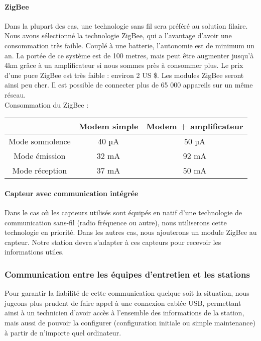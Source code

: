 \paragraph{ZigBee}

Dans la plupart des cas, une technologie sans fil sera préféré au solution filaire. Nous avons sélectionné la technologie ZigBee, qui a l'avantage d'avoir une consommation très faible. Couplé à une batterie, l'autonomie est de minimum un an. 
La portée de ce système est de 100 metres, mais peut être augmenter jusqu'à 4km grâce à un amplificateur si nous sommes près à consommer plus. Le prix d'une puce ZigBee est très faible : environ 2 US \$. Les modules ZigBee seront ainsi peu cher.
Il est possible de connecter plus de 65 000 appareils sur un même réseau.\\

Consommation du ZigBee :

\begin{center}
\begin{tabular}{|c|c|c|}
\hline  & Modem simple & Modem + amplificateur \\ 
\hline Mode somnolence & 40 µA & 50 µA \\ 
\hline Mode émission & 32 mA  & 92 mA \\ 
\hline Mode réception & 37 mA  & 50 mA \\ 
\hline 
\end{tabular} 
\end{center}

\paragraph{Capteur avec communication intégrée}

Dans le cas où les capteurs utilisés sont équipés en natif d'une technologie de communication sans-fil (radio fréquence ou autre), nous utiliserons cette technologie en priorité. Dans les autres cas, nous ajouterons un module ZigBee au capteur. Notre station devra s'adapter à ces capteurs pour recevoir les informations utiles.

\subsubsection{Communication entre les équipes d'entretien et les stations}

Pour garantir la fiabilité de cette communication quelque soit la situation, nous jugeons plus prudent de faire appel à une connexion cablée USB, permettant ainsi à un technicien d'avoir accès à l'ensemble des informations de la station, mais aussi de pouvoir la configurer (configuration initiale ou simple maintenance) à partir de n'importe quel ordinateur.

